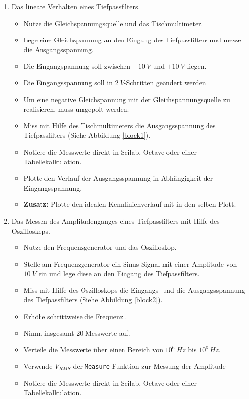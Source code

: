 \begin{enumerate}
	\item Das lineare Verhalten eines Tiefpassfilters.
		\begin{itemize}
			\item Nutze die Gleichspannungsquelle und das Tischmultimeter.
			\item Lege eine Gleichspannung an den Eingang des Tiefpassfilters und messe die Ausgangsspannung.
    		\item Die Eingangspannung soll zwischen $-10~V$ und $+10~V$ liegen.
    		\item Die Eingangsspannung soll in $2~V$-Schritten geändert werden.
    		\item Um eine negative Gleichspannung mit der Gleichspannungsquelle zu realisieren, muss umgepolt werden.
    		\item Miss mit Hilfe des Tischmultimeters die Ausgangsspannung des Tiefpassfilters (Siehe Abbildung \ref{block1}).
    		\item Notiere die Messwerte direkt in Scilab, Octave oder einer Tabellekalkulation.
			\item Plotte den Verlauf der Ausgangsspannung in Abhängigkeit der Eingangsspannung.
			\item \textbf{Zusatz:} Plotte den idealen Kennlinienverlauf mit in den selben Plott.
			\end{itemize}	
	\item Das Messen des Amplitudenganges eines Tiefpassfilters mit Hilfe des Oszilloskops.
		\begin{itemize}
			\item Nutze den Frequenzgenerator und das Oszilloskop.
			\item Stelle am Frequenzgenerator ein Sinus-Signal mit einer Amplitude von $10~V$ ein und lege diese an den Eingang des Tiefpassfilters.
			\item Miss mit Hilfe des Oszilloskops die Eingangs- und die Ausgangsspannung des Tiefpassfilters (Siehe Abbildung \ref{block2}).
			\item Erhöhe schrittweise die Frequenz .
			\item Nimm insgesamt 20 Messwerte auf.
			\item Verteile die Messwerte über einen Bereich von $10^6~Hz$ bis $10^8~Hz$.
			\item Verwende \texttt{$V_{RMS}$} der \texttt{Measure}-Funktion zur Messung der Amplitude
			\item Notiere die Messwerte direkt in Scilab, Octave oder einer Tabellekalkulation.

\end{itemize}
\end{enumerate}
